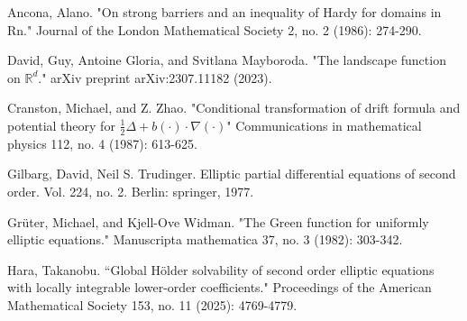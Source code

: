 \documentclass{article}
\theoremstyle{plain}
\theoremstyle{definition}
\theoremstyle{plain}
\begin{document}
\begin{thebibliography}{}
\footnotesize




 Ancona, Alano. "On strong barriers and an inequality of Hardy for domains in Rn." Journal of the London Mathematical Society 2, no. 2 (1986): 274-290.

 David, Guy, Antoine Gloria, and Svitlana Mayboroda. "The landscape function on $\mathbb R^ d$." arXiv preprint arXiv:2307.11182 (2023).


 Cranston, Michael, and Z. Zhao. "Conditional transformation of drift formula and potential theory for $\frac{1}{2}\Delta+ b (\cdot)\cdot\nabla(\cdot)$" Communications in mathematical physics 112, no. 4 (1987): 613-625.




 Gilbarg, David, Neil S. Trudinger. Elliptic partial differential equations of second order. Vol. 224, no. 2. Berlin: springer, 1977.


 Grüter, Michael, and Kjell-Ove Widman. "The Green function for uniformly elliptic equations." Manuscripta mathematica 37, no. 3 (1982): 303-342.

 Hara, Takanobu. ``Global Hölder solvability of second order elliptic equations with locally integrable lower-order coefficients." Proceedings of the American Mathematical Society 153, no. 11 (2025): 4769-4779.


\end{thebibliography}
\end{document}
